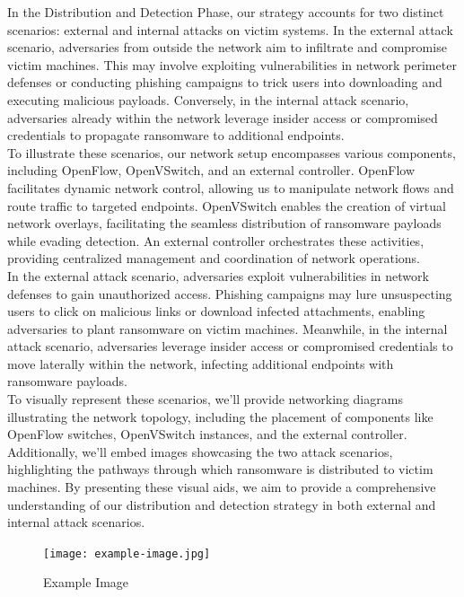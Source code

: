 \documentclass[12pt,twocolumn]{article}
\begin{document}
In the Distribution and Detection Phase, our strategy accounts for two distinct scenarios: external and internal attacks on victim systems. In the external attack scenario, adversaries from outside the network aim to infiltrate and compromise victim machines. This may involve exploiting vulnerabilities in network perimeter defenses or conducting phishing campaigns to trick users into downloading and executing malicious payloads. Conversely, in the internal attack scenario, adversaries already within the network leverage insider access or compromised credentials to propagate ransomware to additional endpoints.
\\
To illustrate these scenarios, our network setup encompasses various components, including OpenFlow, OpenVSwitch, and an external controller. OpenFlow facilitates dynamic network control, allowing us to manipulate network flows and route traffic to targeted endpoints. OpenVSwitch enables the creation of virtual network overlays, facilitating the seamless distribution of ransomware payloads while evading detection. An external controller orchestrates these activities, providing centralized management and coordination of network operations.
\\
In the external attack scenario, adversaries exploit vulnerabilities in network defenses to gain unauthorized access. Phishing campaigns may lure unsuspecting users to click on malicious links or download infected attachments, enabling adversaries to plant ransomware on victim machines. Meanwhile, in the internal attack scenario, adversaries leverage insider access or compromised credentials to move laterally within the network, infecting additional endpoints with ransomware payloads.
\\
To visually represent these scenarios, we'll provide networking diagrams illustrating the network topology, including the placement of components like OpenFlow switches, OpenVSwitch instances, and the external controller. Additionally, we'll embed images showcasing the two attack scenarios, highlighting the pathways through which ransomware is distributed to victim machines. By presenting these visual aids, we aim to provide a comprehensive understanding of our distribution and detection strategy in both external and internal attack scenarios.

\begin{figure}[htbp]
    \centering
    \texttt{[image: example-image.jpg]}
    \caption{Example Image}
    \label{fig:example}
\end{figure}
\end{document}
